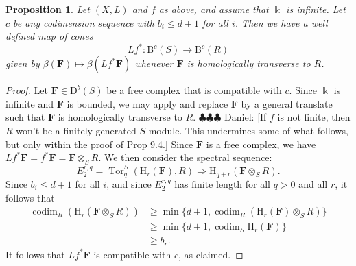 \documentclass[12pt]{amsart}
\newtheorem{prop}[lemma]{Proposition}
\theoremstyle{definition}
\theoremstyle{remark}
\newcommand{\Spec}{\operatorname{Spec}}
\newcommand{\Tor}{\operatorname{Tor}}
\newcommand{\kk}{\Bbbk}
\newcommand{\codim}{\operatorname{codim}}
\newcommand{\PP}{\mathbb{P}}
\newcommand{\HH}{\mathrm{H}}
\newcommand{\ZZ}{\mathbb{Z}}
\newcommand{\bb}{c}
\newcommand{\cO}{\mathcal{O}}
\newcommand{\cE}{\mathcal{E}}
\newcommand{\FF}{\mathbf{F}}
\newcommand{\DD}{\mathrm{D}}
\newcommand{\CQ}{\mathrm{C}}
\newcommand{\BBQ}{\mathrm{B}}
\newcommand{\daniel}[1]{{\color{green} \sf $\clubsuit\clubsuit\clubsuit$ Daniel: [#1]}}
\begin{document}
 \begin{prop}\label{prop:pushpull}
Let $(X,L)$ and $f$ as above, and assume that $\kk$ is infinite.
Let $\bb$ be any codimension sequence with $b_i\leq d+1$ for all $i$.   Then we have a well defined map of cones
	\[
Lf^*\colon \BBQ^{\bb}(S)\to \BBQ^{\bb}(R)
\]
given by $\beta(\FF)\mapsto \beta(Lf^*\FF)$ whenever $\FF$ is homologically transverse to $R$.  


\end{prop}
\begin{proof}
Let $\FF\in \DD^b(S)$ be a free complex that is compatible with $\bb$.  Since $\kk$ is infinite and $\FF$ is bounded, we may apply \cite[Theorem]{miller-speyer} and replace $\FF$ by a general translate such that $\FF$ is homologically transverse to $R$.  \daniel{If $f$ is not finite, then $R$ won't be a finitely generated $S$-module.  This undermines some of what follows, but only within the proof of Prop 9.4.}  Since $\FF$ is a free complex, we have $Lf^*\FF=f^*\FF=\FF\otimes_S R$.   We then consider the spectral sequence:
\[
E^{r,q}_2=\Tor^S_{q}(\HH_r(\FF),R)\Rightarrow \HH_{q+r}(\FF\otimes_S R).
\]
Since $b_i\leq d+1$ for all $i$, and since $E^{r,q}_2$ has finite length for all $q>0$ and all $r$, it follows that
\begin{align*}
\codim_R \left(\HH_{r}(\FF\otimes_S R)\right) &\geq \min\{d+1, \codim_R\left( \HH_r(\FF)\otimes_S R\right)\} \\
&\geq \min\{d+1, \codim_S \HH_r(\FF)\}\\
& \geq b_r.
\end{align*}
It follows that $Lf^*\FF$ is compatible with $\bb$, as claimed.

\end{proof}
\end{document}
